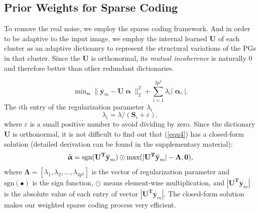\documentclass[10pt,twocolumn,letterpaper]{article}
\begin{document}
\subsection{Prior Weights for Sparse Coding}
To remove the real noise, we employ the sparse coding framework. And in order to be adaptive to the input image, we employ the internal learned $\mathbf{U}$ of each cluster as an adaptive dictioanry to represent the structural variations of the PGs in that cluster. Since the $\mathbf{U}$ is orthonormal, its \emph{mutual incoherence} is naturally $0$ and therefore better than other redundant dictionaries. 

\begin{equation}\label{equ10}
\min\nolimits_{\boldsymbol{\upalpha}}\|\mathbf{\overline{y}}_{m}-\mathbf{U}\boldsymbol{\upalpha}\|_{2}^{2}+\sum_{i=1}^{3p^{2}}\lambda_{i}|\boldsymbol{\upalpha}_{i}|.
\end{equation}
The $i$th entry of the regularization parameter $\lambda_{i}$ 
\begin{equation}\label{equ11}
\lambda_{i} = \lambda/(\mathbf{S}_{i}+\varepsilon),
\end{equation}
where $\varepsilon$ is a small positive number to avoid dividing by zero. Since the dictionary $\mathbf{U}$ is orthonormal, it is not difficult to find out that (\ref{equ4}) has a closed-form solution (detailed derivation can be found in the supplementary material):
\begin{equation}\label{equ12}
\setlength{\abovedisplayskip}{3pt}
\setlength{\belowdisplayskip}{4pt}
\hat{\boldsymbol{\upalpha}}= \text{sgn}(\mathbf{U^{T}\overline{y}}_{m})\odot \text{max}(|\mathbf{U^{T}\overline{y}}_{m}|-\mathbf{\Lambda},\mathbf{0}),
\end{equation}
where $\mathbf{\Lambda} = [\lambda_{1},\lambda_{2},...,\lambda_{3p^2}]$ is the vector of regularization parameter and $\text{sgn}(\bullet)$ is the sign function, $\odot$ means element-wise multiplication, and $|\mathbf{U^{T}\overline{y}}_{m}|$ is the absolute value of each entry of vector $|\mathbf{U^{T}\overline{y}}_{m}|$. The closed-form solution makes our weighted sparse coding process very efficient. 

\end{document}
